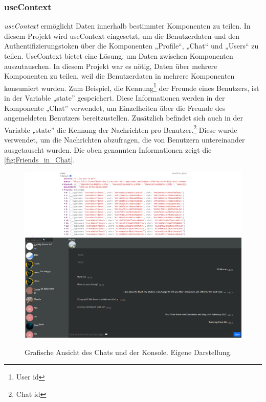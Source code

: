 \subsubsection*{useContext}
\textit{useContext} ermöglicht Daten innerhalb bestimmter Komponenten zu teilen. In diesem Projekt wird useContext eingesetzt, um die Benutzerdaten und den Authentifizierungstoken über die Komponenten  „Profile“, „Chat“ und „Users“ zu teilen. UseContext bietet eine Lösung, um Daten zwischen Komponenten auszutauschen{\cite{R04}}.
\newpage
In diesem Projekt war es nötig, Daten über mehrere Komponenten zu teilen, weil die Benutzerdaten in mehrere Komponenten konsumiert wurden. Zum Beispiel, die Kennung\footnote{User id} der Freunde eines Benutzers, ist in der Variable „state” gespeichert. Diese Informationen werden in der Komponente „Chat” verwendet, um Einzelheiten über die Freunde des angemeldeten Benutzers bereitzustellen. Zusätzlich befindet sich auch in der Variable „state” die Kennung der Nachrichten pro Benutzer.\footnote{Chat id} Diese wurde verwendet, um die Nachrichten abzufragen, die von Benutzern untereinander ausgetauscht wurden. 
Die oben genannten Informationen zeigt die \autoref{fig:Friends_in_Chat}.
\begin{figure}[h!]
  \centering
  \includegraphics[scale=0.43]{sources/Friends_in_Chat}
  \caption[Einzelheiten der Freunden]{}
  \label{fig:Friends_in_Chat} 
  Grafische Ansicht des Chats und der Konsole. Eigene Darstellung.
\end{figure} 
